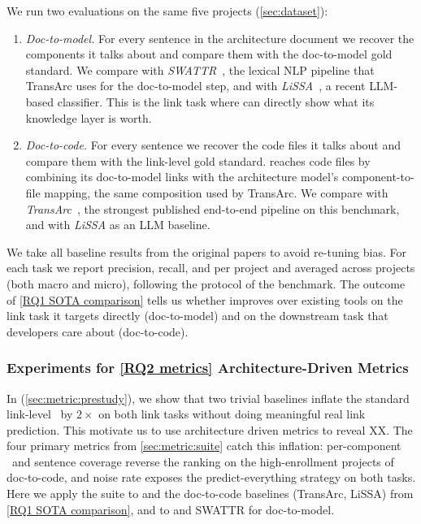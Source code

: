 We run two evaluations on the same five projects (\autoref{sec:dataset}):
\begin{enumerate}[leftmargin=*]
    \item \emph{Doc-to-model.} For every sentence in the architecture document we recover the components it talks about and compare them with the doc-to-model gold standard. We compare \approach{} with \emph{SWATTR}~\cite{swattr}, the lexical NLP pipeline that TransArc uses for the doc-to-model step, and with \emph{LiSSA}~\cite{lissa}, a recent \ac{LLM}-based classifier. This is the link task where \approach{} can directly show what its knowledge layer is worth.
    \item \emph{Doc-to-code.} For every sentence we recover the code files it talks about and compare them with the link-level gold standard. \approach{} reaches code files by combining its doc-to-model links with the architecture model's component-to-file mapping, the same composition used by TransArc. We compare \approach{} with \emph{TransArc}~\cite{transarc}, the strongest published end-to-end pipeline on this benchmark, and with \emph{LiSSA} as an \ac{LLM} baseline.
\end{enumerate}
We take all baseline results from the original papers to avoid re-tuning bias.
For each task we report precision, recall, and \fone per project and averaged across projects (both macro and micro), following the protocol of the benchmark.
The outcome of \ref{RQ1 SOTA comparison} tells us whether \approach{} improves over existing tools on the link task it targets directly (doc-to-model) and on the downstream task that developers care about (doc-to-code).

\subsubsection{Experiments for \ref{RQ2 metrics} Architecture-Driven Metrics}
\label{sec:exp:rq2}

In (\autoref{sec:metric:prestudy}), we show that two trivial baselines inflate the standard link-level \fone\ by $2\times$ on both link tasks without doing meaningful real link prediction. 
This motivate us to use architecture driven metrics to reveal XX.  
The four primary metrics from \autoref{sec:metric:suite} catch this inflation: per-component \fone\ and sentence coverage reverse the ranking on the high-enrollment projects of doc-to-code, and noise rate exposes the predict-everything strategy on both tasks.
Here we apply the suite to \approach{} and the doc-to-code baselines (TransArc, LiSSA) from \ref{RQ1 SOTA comparison}, and to \approach{} and SWATTR for doc-to-model.

